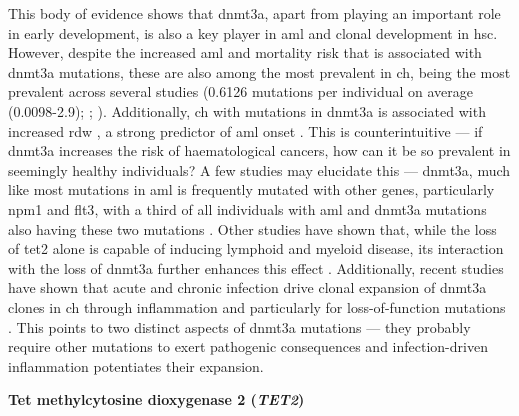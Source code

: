 This body of evidence shows that \ac{dnmt3a}, apart from playing an important role in early development, is also a key player in \ac{aml} and clonal development in \ac{hsc}. However, despite the increased \ac{aml} and mortality risk that is associated with \ac{dnmt3a} mutations, these are also among the most prevalent in \ac{ch}, being the most prevalent across several studies \cite{Jaiswal2014-rl,Genovese2014-eu,Zink2017-zi,Bolton2020-ct,Coombs2017-ph,McKerrell2015-rl,Acuna-Hidalgo2017-ng,Desai2018-pj,Young2016-du,Young2019-rz} (0.6126 mutations per individual on average (0.0098-2.9); ; ). Additionally, \ac{ch} with mutations in \ac{dnmt3a} is associated with increased \ac{rdw} \cite{Dawoud2020-af}, a strong predictor of \ac{aml} onset \cite{Abelson2018-wh}. This is counterintuitive --- if \ac{dnmt3a} increases the risk of haematological cancers, how can it be so prevalent in seemingly healthy individuals? A few studies may elucidate this --- \ac{dnmt3a}, much like most mutations in \ac{aml} is frequently mutated with other genes, particularly \ac{npm1} and \ac{flt3}, with a third of all individuals with \ac{aml} and \ac{dnmt3a} mutations also having these two mutations \cite{noauthor_2013-ti,Bezerra2020-zc}. Other studies have shown that, while the loss of \ac{tet2} alone is capable of inducing lymphoid and myeloid disease, its interaction with the loss of \ac{dnmt3a} further enhances this effect \cite{Zhang2016-ys}. Additionally, recent studies have shown that acute and chronic infection drive clonal expansion of \ac{dnmt3a} clones in \ac{ch} through inflammation and particularly for loss-of-function mutations \cite{Hormaechea_Agulla2019-cd,Hormaechea-Agulla2021-kr}. This points to two distinct aspects of \ac{dnmt3a} mutations --- they probably require other mutations to exert pathogenic consequences and infection-driven inflammation potentiates their expansion.

\noindent \textbf{Tet methylcytosine dioxygenase 2 (\textit{TET2})}

